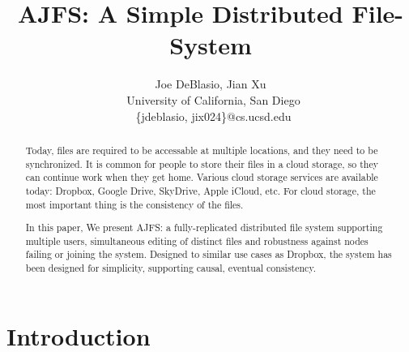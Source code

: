 \documentclass[preprint]{sig-alternate-10pt}
\begin{document}



\title{AJFS: A Simple Distributed File-System}

\author{Joe DeBlasio, Jian Xu\\\
       University of California, San Diego \\\
       \{jdeblasio, jix024\}@cs.ucsd.edu}

\maketitle

\begin{abstract}
    Today, files are required to be accessable at multiple locations,
    and they need to be synchronized. It is common for people to
    store their files in a cloud storage, so they can continue work when they
    get home. Various cloud storage services are available today: Dropbox,
    Google Drive, SkyDrive, Apple iCloud, etc. For cloud storage, the most
    important thing is the consistency of the files.

    In this paper, We present AJFS: a fully-replicated distributed file system supporting
    multiple users, simultaneous editing of distinct files and robustness
    against nodes failing or joining the system. Designed to similar use cases
    as Dropbox, the system has been designed for simplicity, supporting causal,
    eventual consistency.
\end{abstract}

\section{Introduction}
    
\end{document}
